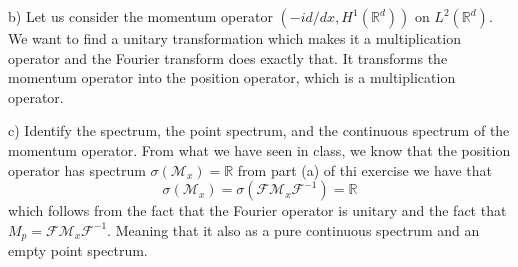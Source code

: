 \documentclass{article}
\newcommand{\R}{\mathbb{R}}
\newcommand{\M}{\mathcal{M}}
\newcommand{\F}{\mathcal{F}}
\begin{document}
b) Let us consider the momentum operator $(-i d / dx, H^1(\R^d))$ on $L^2(\R^d)$. We want to find a unitary transformation which makes it a multiplication operator and the Fourier transform does exactly that. It transforms the momentum operator into the position operator, which is a multiplication operator.

c) Identify the spectrum, the point spectrum, and the continuous spectrum of
the momentum operator. From what we have seen in class, we know that the position operator has spectrum $\sigma(\M_x) = \R$ from part (a) of thi exercise we have that
\[
    \sigma(\M_x) = \sigma(\F \M_x \F^{-1}) = \R
\]
which follows from the fact that the Fourier operator is unitary and the fact that $M_p = \F \M_x \F^{-1}$. Meaning that it also as a pure continuous spectrum and an empty point spectrum. 
\end{document}
